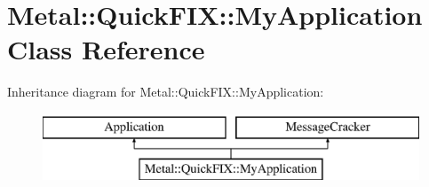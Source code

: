 \hypertarget{classMetal_1_1QuickFIX_1_1MyApplication}{}\section{Metal\+:\+:Quick\+F\+I\+X\+:\+:My\+Application Class Reference}
\label{classMetal_1_1QuickFIX_1_1MyApplication}
Inheritance diagram for Metal\+:\+:Quick\+F\+I\+X\+:\+:My\+Application\+:\begin{figure}[H]
\begin{center}
\leavevmode
\includegraphics[height=2.000000cm]{classMetal_1_1QuickFIX_1_1MyApplication}
\end{center}
\end{figure}
